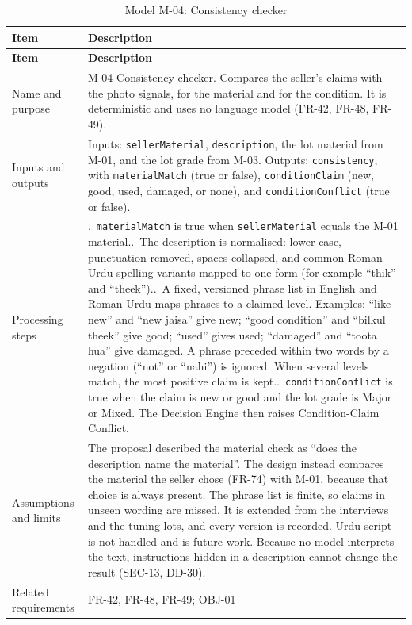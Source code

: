 {\footnotesize
\begin{longtable}{@{}>{\raggedright\arraybackslash}p{}>{\raggedright\arraybackslash}p{}@{}}
\caption{Model M-04: Consistency checker}\label{tab:m-04}\\
\toprule
\textbf{Item} & \textbf{Description} \\
\midrule
\endfirsthead
\toprule
\textbf{Item} & \textbf{Description} \\
\midrule
\endhead
Name and purpose & M-04 Consistency checker. Compares the seller's claims with the photo signals, for the material and for the condition. It is deterministic and uses no language model (FR-42, FR-48, FR-49). \\
Inputs and outputs & Inputs: \texttt{sellerMaterial}, \texttt{description}, the lot material from M-01, and the lot grade from M-03. Outputs: \texttt{consistency}, with \texttt{materialMatch} (true or false), \texttt{conditionClaim} (new, good, used, damaged, or none), and \texttt{conditionConflict} (true or false). \\
Processing steps & 1.~\texttt{materialMatch} is true when \texttt{sellerMaterial} equals the M-01 material.\newline
2.~The description is normalised: lower case, punctuation removed, spaces collapsed, and common Roman Urdu spelling variants mapped to one form (for example ``thik'' and ``theek'').\newline
3.~A fixed, versioned phrase list in English and Roman Urdu maps phrases to a claimed level. Examples: ``like new'' and ``new jaisa'' give new; ``good condition'' and ``bilkul theek'' give good; ``used'' gives used; ``damaged'' and ``toota hua'' give damaged. A phrase preceded within two words by a negation (``not'' or ``nahi'') is ignored. When several levels match, the most positive claim is kept.\newline
4.~\texttt{conditionConflict} is true when the claim is new or good and the lot grade is Major or Mixed. The Decision Engine then raises Condition-Claim Conflict. \\
Assumptions and limits & The proposal described the material check as ``does the description name the material''. The design instead compares the material the seller chose (FR-74) with M-01, because that choice is always present. The phrase list is finite, so claims in unseen wording are missed. It is extended from the interviews and the tuning lots, and every version is recorded. Urdu script is not handled and is future work. Because no model interprets the text, instructions hidden in a description cannot change the result (SEC-13, DD-30). \\
Related requirements & FR-42, FR-48, FR-49; OBJ-01 \\
\bottomrule
\end{longtable}
}

